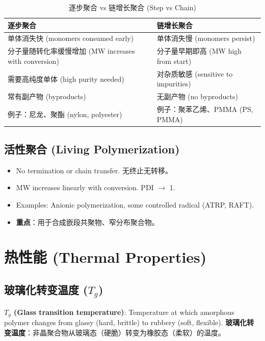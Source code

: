 \documentclass[12pt,a4paper]{ctexart}
\begin{document}
\begin{table}[h!]
\centering
\caption{逐步聚合 vs 链增长聚合 (Step vs Chain)}
\begin{tabular}{p{5cm}p{5cm}}
\toprule
\textbf{逐步聚合} & \textbf{链增长聚合} \\
\midrule
单体消失快 (monomers consumed early) & 单体消失慢 (monomers persist) \\
分子量随转化率缓慢增加 (MW increases with conversion) & 分子量早期即高 (MW high from start) \\
需要高纯度单体 (high purity needed) & 对杂质敏感 (sensitive to impurities) \\
常有副产物 (byproducts) & 无副产物 (no byproducts) \\
例子：尼龙、聚酯 (nylon, polyester) & 例子：聚苯乙烯、PMMA (PS, PMMA) \\
\bottomrule
\end{tabular}
\end{table}

\subsection{活性聚合 (Living Polymerization)}
\begin{itemize}
    \item No termination or chain transfer. 无终止无转移。
    \item MW increases linearly with conversion. PDI $\to$ 1.
    \item Examples: Anionic polymerization, some controlled radical (ATRP, RAFT).
    \item \textbf{重点}：用于合成嵌段共聚物、窄分布聚合物。
\end{itemize}

\section{热性能 (Thermal Properties)}

\subsection{玻璃化转变温度 ($T_g$)}
\textbf{$T_g$ (Glass transition temperature)}: Temperature at which amorphous polymer changes from glassy (hard, brittle) to rubbery (soft, flexible).  
\textbf{玻璃化转变温度}：非晶聚合物从玻璃态（硬脆）转变为橡胶态（柔软）的温度。
\end{document}
